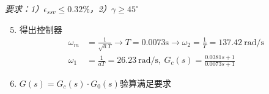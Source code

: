 \documentclass[handout,cjkutf8,table,aspectratio=1610]{beamer} %
\begin{document}
\begin{frame}{}
	\emph{要求：1）$\epsilon_{ssv}\le 0.32\%$，2）$\gamma \ge 45^\circ$}
	\begin{enumerate}[(1)]
		\setcounter{enumi}{4}
		\item 得出控制器
		\begin{align*}
			\omega_m &= \frac{1}{\sqrt{a}T} \rightarrow T=0.0073 \text{s} \rightarrow \omega_2 = \frac{1}{T} = 137.42~\text{rad/s}\\
			\omega_1 &= \frac{1}{aT} = 26.23~\text{rad/s},~G_c(s) = \frac{0.0381s+1}{0.0073s+1}
		\end{align*}
		\item $G(s) = G_c(s)\cdot G_0(s)$验算满足要求
	\end{enumerate}
\end{frame}
\end{document}
